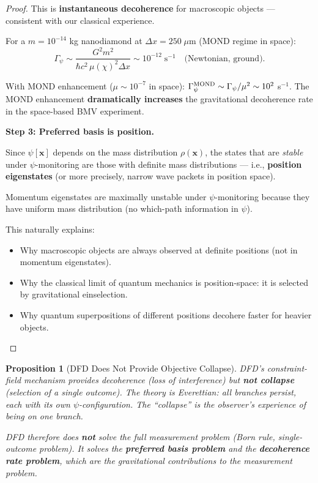 \documentclass[11pt,a4paper]{article}
\newtheorem{proposition}{Proposition}
\begin{document}
\begin{proof}
This is \textbf{instantaneous decoherence} for macroscopic objects --- consistent with our classical experience.

For a $m = 10^{-14}$ kg nanodiamond at $\Delta x = 250\;\mu$m (MOND regime in space):
\begin{equation}
\Gamma_\psi \sim \frac{G^2 m^2}{\hbar c^2\,\mu(\chi)^2 \Delta x} \sim 10^{-12}\;\text{s}^{-1} \quad\text{(Newtonian, ground)}.
\end{equation}

With MOND enhancement ($\mu \sim 10^{-7}$ in space): $\Gamma_\psi^{\rm MOND} \sim \Gamma_\psi/\mu^2 \sim 10^{2}$ s$^{-1}$. The MOND enhancement \textbf{dramatically increases} the gravitational decoherence rate in the space-based BMV experiment.

\textbf{Step 3: Preferred basis is position.}

Since $\psi[\mathbf{x}]$ depends on the mass distribution $\rho(\mathbf{x})$, the states that are \emph{stable} under $\psi$-monitoring are those with definite mass distributions --- i.e., \textbf{position eigenstates} (or more precisely, narrow wave packets in position space).

Momentum eigenstates are maximally unstable under $\psi$-monitoring because they have uniform mass distribution (no which-path information in $\psi$).

This naturally explains:
\begin{itemize}
\item Why macroscopic objects are always observed at definite positions (not in momentum eigenstates).
\item Why the classical limit of quantum mechanics is position-space: it is selected by gravitational einselection.
\item Why quantum superpositions of different positions decohere faster for heavier objects.
\end{itemize}
\end{proof}

\begin{proposition}[DFD Does Not Provide Objective Collapse]
DFD's constraint-field mechanism provides decoherence (loss of interference) but \textbf{not collapse} (selection of a single outcome). The theory is Everettian: all branches persist, each with its own $\psi$-configuration. The ``collapse'' is the observer's experience of being on one branch.

DFD therefore does \textbf{not} solve the full measurement problem (Born rule, single-outcome problem). It solves the \textbf{preferred basis problem} and the \textbf{decoherence rate problem}, which are the gravitational contributions to the measurement problem.
\end{proposition}
\end{document}
